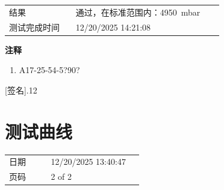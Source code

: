 \documentclass[UTF8,10pt,a4paper,fontset=fandol]{ctexart}
\newcommand{\fieldvalue}[1]{#1}
\newcommand{\handwritten}[1]{#1}
\begin{document}
\vspace{1em}

\begin{tabular}{@{}p{0.28\linewidth}p{0.62\linewidth}@{}}
结果 &
\fieldvalue{通过，在标准范围内：4950\ mbar}
\\
测试完成时间 &
\fieldvalue{12/20/2025 14:21:08}
\\
\end{tabular}

\vspace{1em}

\textbf{注释}

\begin{enumerate}
\item
\fieldvalue{\handwritten{A17-25-54-5?90?}}
\end{enumerate}

\fieldvalue{\handwritten{[签名].12}}

\section{测试曲线}

\begin{tabular}{@{}p{0.28\linewidth}p{0.62\linewidth}@{}}
日期 &
\fieldvalue{12/20/2025 13:40:47}
\\
页码 &
\fieldvalue{2 of 2}
\\
\end{tabular}

\vspace{1em}

\begin{figure}[ht]
\centering
{}
\end{figure}
\end{document}
